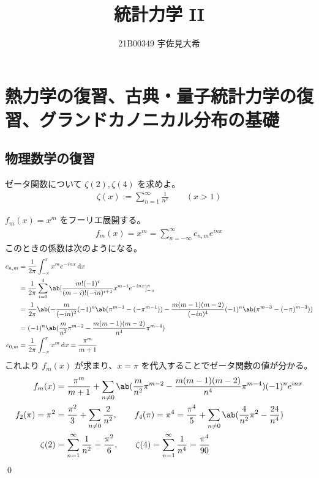 \documentclass[uplatex,dvipdfmx,a4paper,11pt]{jlreq}
\title{統計力学 II}
\author{21B00349 宇佐見大希}
\makeatletter
\numberwithin{equation}{section}
\theoremstyle{definition}
\renewenvironment{proof}[1][\proofname]{\par
  \normalfont
  \topsep6\p@\@plus6\p@ \trivlist
  \item[\hskip\labelsep{\bfseries #1}\@addpunct{\bfseries}]\ignorespaces\quad\par
}{%
  \qed\endtrivlist\@endpefalse
}
\renewcommand\proofname{証明}
\makeatother
\begin{document}
\maketitle
\tableofcontents
\clearpage

\section{熱力学の復習、古典・量子統計力学の復習、グランドカノニカル分布の基礎}
\setcounter{subsection}{3}
\subsection{物理数学の復習}
\begin{problem}
ゼータ関数について $\zeta(2), \zeta(4)$ を求めよ。
\begin{align}
  \zeta(x) := \sum_{n=1}^{\infty}\frac{1}{n^x} \qquad (x > 1)
\end{align}
\end{problem}
\begin{proof}
  $f_m(x) = x^m$ をフーリエ展開する。
  \begin{align}
    f_m(x) = x^m = \sum_{n=-\infty}^{\infty}c_{n,m}e^{inx}
  \end{align}
  このときの係数は次のようになる。
  \begin{align}
    c_{n,m} & = \frac{1}{2\pi}\int_{-\pi}^{\pi}x^me^{-inx}\dl{x}                                                                                              \\
            & = \frac{1}{2\pi}\sum_{i=0}^{4}\ab[\frac{m!(-1)^i}{(m-i)!(-in)^{i+1}}x^{m-i}e^{-inx}]_{-\pi}^{\pi}                                               \\
            & = \frac{1}{2\pi}\ab(-\frac{m}{(-in)^{2}}(-1)^n\ab(\pi^{m-1} - (-\pi^{m-1})) - \frac{m(m-1)(m-2)}{(-in)^{4}}(-1)^n\ab(\pi^{m-3} - (-\pi)^{m-3})) \\
            & = (-1)^n\ab(\frac{m}{n^2}\pi^{m-2} - \frac{m(m-1)(m-2)}{n^4}\pi^{m-4})                                                                          \\
    c_{0,m} & = \frac{1}{2\pi}\int_{-\pi}^\pi x^m\dl{x} = \frac{\pi^m}{m+1}
  \end{align}
  これより $f_m(x)$ が求まり、$x = \pi$ を代入することでゼータ関数の値が分かる。
  \begin{align}
    f_m(x)           & = \frac{\pi^m}{m+1} + \sum_{n\neq 0}\ab(\frac{m}{n^2}\pi^{m-2} - \frac{m(m-1)(m-2)}{n^4}\pi^{m-4})(-1)^ne^{inx}                                     \\
    f_2(\pi) = \pi^2 & = \frac{\pi^2}{3} + \sum_{n\neq 0}\frac{2}{n^2}, \qquad f_4(\pi) = \pi^4 = \frac{\pi^4}{5} + \sum_{n\neq 0}\ab(\frac{4}{n^2}\pi^2 - \frac{24}{n^4}) \\
    \zeta(2)         & = \sum_{n=1}^\infty\frac{1}{n^2} = \frac{\pi^2}{6}, \qquad \zeta(4) = \sum_{n=1}^\infty\frac{1}{n^4} = \frac{\pi^4}{90}
  \end{align}
\end{proof}
\end{document}
